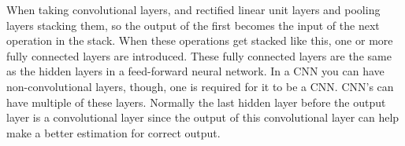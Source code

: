 When taking convolutional layers, and rectified linear unit layers and pooling layers stacking them, so the output of the first becomes the input of the next operation in the stack. When these operations get stacked like this, one or more fully connected layers are introduced. These fully connected layers are the same as the hidden layers in a feed-forward neural network. In a CNN you can have non-convolutional layers, though, one is required for it to be a CNN. CNN's can have multiple of these layers. Normally the last hidden layer before the output layer is a convolutional layer since the output of this convolutional layer can help make a better estimation for correct output.